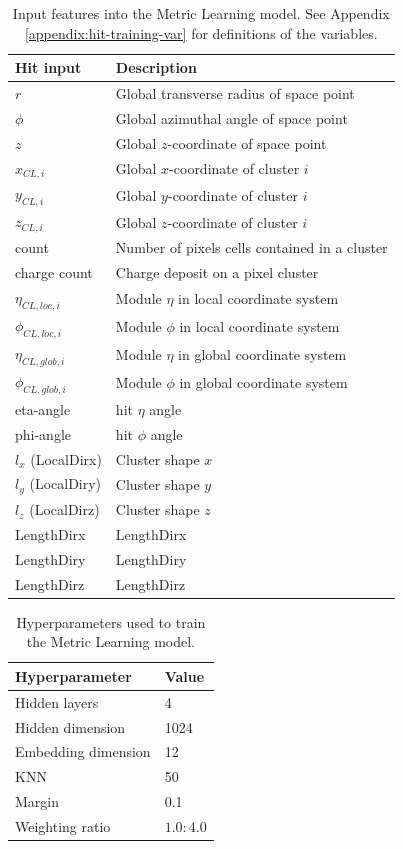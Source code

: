 \newpage
\begin{table}[h!]
    \centering
    \begin{tabular}{l|l}
    \hline
     Hit input    &  Description\\
     \hline
      $r$   & Global transverse radius of space point \\
      $\phi$ & Global azimuthal angle of space point\\
      $z$ & Global $z$-coordinate of space point\\
      $x_{CL, i}$ & Global $x$-coordinate of cluster $i$ \\
      $y_{CL, i}$ & Global $y$-coordinate of cluster $i$ \\
      $z_{CL, i}$ & Global $z$-coordinate of cluster $i$ \\
      count & Number of pixels cells contained in a cluster \\
      charge count & Charge deposit on a pixel cluster \\
      $\eta_{CL,loc,i}$ & Module $\eta$ in local coordinate system \\
      $\phi_{CL,loc,i}$ & Module $\phi$ in local coordinate system \\
      $\eta_{CL,glob,i}$ & Module $\eta$ in global coordinate system \\
      $\phi_{CL,glob,i}$ & Module $\phi$ in global coordinate system \\
      eta-angle & hit $\eta$ angle \\
      phi-angle & hit $\phi$ angle \\
      $l_x$ (LocalDirx) & Cluster shape $x$\\
      $l_y$ (LocalDiry)& Cluster shape $y$\\
      $l_z$ (LocalDirz)& Cluster shape $z$\\
      LengthDirx & LengthDirx \\
      LengthDiry & LengthDiry \\
      LengthDirz & LengthDirz \\
      \hline
    \end{tabular}
    \caption{Input features into the Metric Learning model. See Appendix \ref{appendix:hit-training-var} for definitions of the variables.}
    \label{tab:input-metric-learning}
\end{table}

\begin{table}[h!]
    \centering
    \begin{tabular}{l|l}
    \hline
      Hyperparameter   &  Value \\ \hline 
       Hidden layers   & 4\\
       Hidden dimension& 1024 \\
       Embedding dimension & 12 \\
       KNN & 50 \\
       Margin & 0.1 \\
       Weighting ratio & $1.0:4.0$ \\
    \hline
    \end{tabular}
    \caption{Hyperparameters used to train the Metric Learning model.}
    \label{tab:metric-learning-specification}
\end{table}

